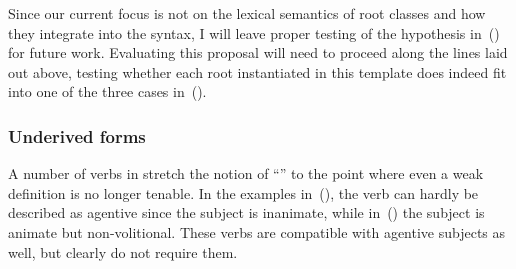 \begin{exe}
\begin{xlist}
\begin{exe}
\begin{xlist}
\begin{exe}
\begin{xlist}
\begin{exe}
\begin{exe}
\begin{xlist}
\begin{exe}
\begin{xlist}
\begin{exe}
\begin{xlist}
\begin{exe}
\begin{xlist}
\begin{exe}
\begin{xlist}
\begin{exe}
\begin{xlist}
\begin{exe}
\begin{xlist}
\begin{exe}
\begin{xlist}
\begin{exe}
\begin{xlist}
\begin{exe}
\begin{xlist}
\begin{exe}
\begin{xlist}
\begin{exe}
\begin{xlist}
\begin{exe}
\begin{exe}
\begin{xlist}
\begin{exe}
\begin{xlist}
\begin{exe}
\begin{xlist}
\begin{exe}
\begin{xlist}
{\begin{exe}
\begin{xlist}
\begin{exe}
\begin{xlist}
\begin{exe}
\begin{xlist}
\begin{exe}
\begin{xlist}
\begin{xlist}
\begin{xlist}
\begin{exe}
\begin{xlist}
\begin{xlist}
\begin{xlist}
\begin{exe}
\begin{exe}
\begin{xlist}
\begin{exe}
\begin{xlist}
\begin{exe}
\begin{xlist}
\begin{exe}
\begin{xlist}
\begin{exe}
\begin{xlist}
\begin{exe}
\begin{xlist}
\begin{exe}
\begin{exe}
\begin{xlist}
\begin{xlist}
\begin{exe}
\begin{xlist}
\begin{exe}
\begin{xlist}
\begin{exe}
\begin{xlist}
\begin{exe}
\begin{xlist}
\begin{exe}
\begin{xlist}
\begin{exe}
\begin{xlist}
\begin{exe}
\begin{exe}
\begin{xlist}
\begin{exe}
\begin{xlist}
\begin{exe}
\begin{xlist}
\begin{exe}
\begin{xlist}
\begin{exe}
\begin{xlist}
\begin{exe}
\begin{xlist}
Since our current focus is not on the lexical semantics of root classes and how they integrate into the syntax, I will leave proper testing of the hypothesis in~(\lastx) for future work. Evaluating this proposal will need to proceed along the lines laid out above, testing whether each root instantiated in this template does indeed fit into one of the three cases in~(\lastx).

		\subsubsection{Underived forms} \label{voice:va:sem:underived}
A number of verbs in {\tpie} stretch the notion of ``'' to the point where even a weak definition is no longer tenable. In the examples in~(\nextx), the verb can hardly be described as agentive since the subject is inanimate, while in~(\anextx) the subject is animate but non-volitional. These verbs are compatible with agentive subjects as well, but clearly do not require them.

\end{xlist}
\end{exe}
\end{xlist}
\end{exe}
\end{xlist}
\end{exe}
\end{xlist}
\end{exe}
\end{xlist}
\end{exe}
\end{xlist}
\end{exe}
\end{exe}
\end{xlist}
\end{exe}
\end{xlist}
\end{exe}
\end{xlist}
\end{exe}
\end{xlist}
\end{exe}
\end{xlist}
\end{exe}
\end{xlist}
\end{exe}
\end{xlist}
\end{xlist}
\end{exe}
\end{exe}
\end{xlist}
\end{exe}
\end{xlist}
\end{exe}
\end{xlist}
\end{exe}
\end{xlist}
\end{exe}
\end{xlist}
\end{exe}
\end{xlist}
\end{exe}
\end{exe}
\end{xlist}
\end{xlist}
\end{xlist}
\end{exe}
\end{xlist}
\end{xlist}
\end{xlist}
\end{exe}
\end{xlist}
\end{exe}
\end{xlist}
\end{exe}
\end{xlist}
\end{exe}}
\end{xlist}
\end{exe}
\end{xlist}
\end{exe}
\end{xlist}
\end{exe}
\end{xlist}
\end{exe}
\end{exe}
\end{xlist}
\end{exe}
\end{xlist}
\end{exe}
\end{xlist}
\end{exe}
\end{xlist}
\end{exe}
\end{xlist}
\end{exe}
\end{xlist}
\end{exe}
\end{xlist}
\end{exe}
\end{xlist}
\end{exe}
\end{xlist}
\end{exe}
\end{xlist}
\end{exe}
\end{xlist}
\end{exe}
\end{xlist}
\end{exe}
\end{exe}
\end{xlist}
\end{exe}
\end{xlist}
\end{exe}
\end{xlist}
\end{exe}
